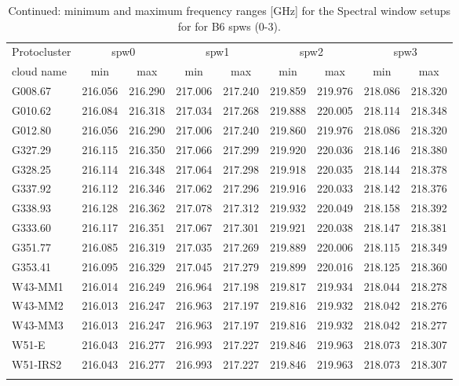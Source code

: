\begin{table}[htbp!]
\ContinuedFloat
\centering
\caption{Continued: minimum and maximum frequency ranges [GHz] for the Spectral window setups for for B6 spws (0-3).}
\begin{tabular}{@{\extracolsep{6pt}}lcccccccc@{}}
\hline \noalign {\smallskip}
Protocluster  & \multicolumn{2}{c}{spw0} & \multicolumn{2}{c}{spw1} & \multicolumn{2}{c}{spw2}& \multicolumn{2}{c}{spw3} \\ 
\cline{2-3}\cline{4-5}\cline{6-7}\cline{8-9}
cloud name\tnote{1}  & min & max  & min & max  & min & max  & min & max  \\
\hline \noalign {\smallskip}
G008.67 & 216.056&216.290&217.006&217.240&219.859&219.976&218.086&218.320 \\
G010.62 & 216.084&216.318&217.034&217.268&219.888&220.005&218.114&218.348 \\
G012.80 & 216.056&216.290&217.006&217.240&219.860&219.976&218.086&218.320 \\
G327.29 & 216.115&216.350&217.066&217.299&219.920&220.036&218.146&218.380 \\
G328.25 & 216.114&216.348&217.064&217.298&219.918&220.035&218.144&218.378 \\
G337.92 & 216.112&216.346&217.062&217.296&219.916&220.033&218.142&218.376 \\
G338.93 & 216.128&216.362&217.078&217.312&219.932&220.049&218.158&218.392 \\
G333.60 & 216.117&216.351&217.067&217.301&219.921&220.038&218.147&218.381 \\
G351.77 & 216.085&216.319&217.035&217.269&219.889&220.006&218.115&218.349 \\
G353.41 & 216.095&216.329&217.045&217.279&219.899&220.016&218.125&218.360 \\
W43-MM1 & 216.014&216.249&216.964&217.198&219.817&219.934&218.044&218.278 \\
W43-MM2 & 216.013&216.247&216.963&217.197&219.816&219.932&218.042&218.276 \\
W43-MM3 & 216.013&216.247&216.963&217.197&219.816&219.932&218.042&218.277 \\
W51-E & 216.043&216.277&216.993&217.227&219.846&219.963&218.073&218.307 \\
W51-IRS2 & 216.043&216.277&216.993&217.227&219.846&219.963&218.073&218.307 \\
\hline \noalign {\smallskip}
\end{tabular}

\end{table}



